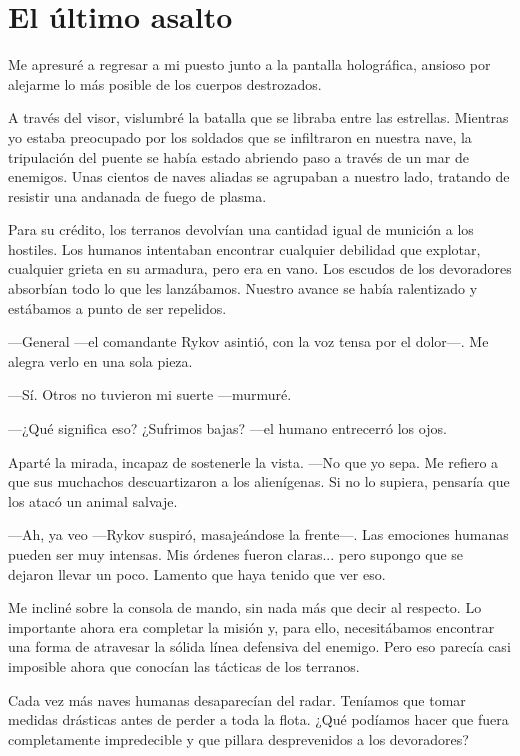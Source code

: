 \chapter{El último asalto}\label{sec:el-ultimo-asalto}

Me apresuré a regresar a mi puesto junto a la pantalla holográfica, ansioso por alejarme lo más posible de los cuerpos destrozados.

A través del visor, vislumbré la batalla que se libraba entre las estrellas. Mientras yo estaba preocupado por los soldados que se infiltraron en nuestra nave, la tripulación del puente se había estado abriendo paso a través de un mar de enemigos. Unas cientos de naves aliadas se agrupaban a nuestro lado, tratando de resistir una andanada de fuego de plasma.

Para su crédito, los terranos devolvían una cantidad igual de munición a los hostiles. Los humanos intentaban encontrar cualquier debilidad que explotar, cualquier grieta en su armadura, pero era en vano. Los escudos de los devoradores absorbían todo lo que les lanzábamos. Nuestro avance se había ralentizado y estábamos a punto de ser repelidos.

—General —el comandante Rykov asintió, con la voz tensa por el dolor—. Me alegra verlo en una sola pieza.

—Sí. Otros no tuvieron mi suerte —murmuré.

 —¿Qué significa eso? ¿Sufrimos bajas? —el humano entrecerró los ojos.

Aparté la mirada, incapaz de sostenerle la vista. —No que yo sepa. Me refiero a que sus muchachos descuartizaron a los alienígenas. Si no lo supiera, pensaría que los atacó un animal salvaje.

—Ah, ya veo —Rykov suspiró, masajeándose la frente—. Las emociones humanas pueden ser muy intensas. Mis órdenes fueron claras... pero supongo que se dejaron llevar un poco. Lamento que haya tenido que ver eso.

Me incliné sobre la consola de mando, sin nada más que decir al respecto. Lo importante ahora era completar la misión y, para ello, necesitábamos encontrar una forma de atravesar la sólida línea defensiva del enemigo. Pero eso parecía casi imposible ahora que conocían las tácticas de los terranos.

Cada vez más naves humanas desaparecían del radar. Teníamos que tomar medidas drásticas antes de perder a toda la flota. ¿Qué podíamos hacer que fuera completamente impredecible y que pillara desprevenidos a los devoradores?

